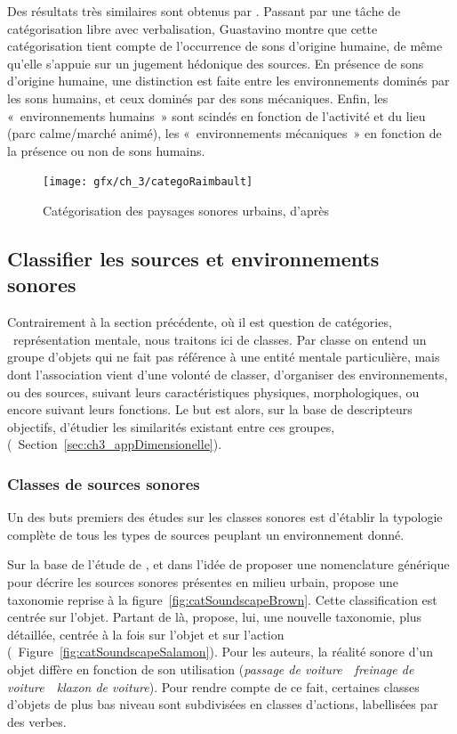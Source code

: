 Des résultats très similaires sont obtenus par \citep{guastavino2007categorization}. Passant par une tâche de catégorisation libre avec verbalisation, Guastavino montre que cette catégorisation tient compte de l'occurrence de sons d'origine humaine, de même qu'elle s'appuie sur un jugement hédonique des sources. En présence de sons d'origine humaine, une distinction est faite entre les environnements dominés par les sons humains, et ceux dominés par des sons mécaniques. Enfin, les «~environnements humains~» sont scindés en fonction de l'activité et du lieu (parc calme/marché animé), les «~environnements mécaniques~» en fonction de la présence ou non de sons humains.

\begin{figure}[t]
        \myfloatalign
        \texttt{[image: gfx/ch\_3/categoRaimbault]}
        \caption[Catégorisation des paysages sonores urbains.]{Catégorisation des paysages sonores urbains, d'après \citep{raimbault2005urban}}\label{fig:catSoundscapeRaimbault}
\end{figure}

\subsection{Classifier les sources et environnements sonores}

Contrairement à la section précédente, où il est question de catégories, \ie~représentation mentale, nous traitons ici de classes. Par classe on entend un groupe d'objets qui ne fait pas référence à une entité mentale particulière, mais dont l'association vient d'une volonté de classer, d'organiser des environnements, ou des sources, suivant leurs caractéristiques physiques, morphologiques, ou encore suivant leurs fonctions. Le but est alors, sur la base de descripteurs objectifs, d'étudier les similarités existant entre ces groupes, (\cf~Section~\ref{sec:ch3_appDimensionelle}).


\subsubsection{Classes de sources sonores}

Un des buts premiers des études sur les classes sonores est d'établir la typologie complète de tous les types de sources peuplant un environnement donné.

Sur la base de l'étude de \citep{raimbault2005urban}, et dans l'idée de proposer une nomenclature générique pour décrire les sources sonores présentes en milieu urbain, \citep{brown2011towards} propose une taxonomie reprise à la figure~\ref{fig:catSoundscapeBrown}. Cette classification est centrée sur l'objet. Partant de là, \citep{Salamon14} propose, lui, une nouvelle taxonomie, plus détaillée, centrée à la fois sur l'objet et sur l'action (\cf~Figure~\ref{fig:catSoundscapeSalamon}). Pour les auteurs, la réalité sonore d'un objet diffère en fonction de son utilisation (\emph{passage de voiture}~\vs~\emph{freinage de voiture}~\vs~\emph{klaxon de voiture}). Pour rendre compte de ce fait, certaines classes d'objets de plus bas niveau sont subdivisées en classes d'actions, labellisées par des verbes.

